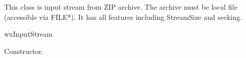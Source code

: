 %
%


\section{}\label{wxzipinputstream}

This class is input stream from ZIP archive. The archive
must be local file (accessible via FILE*).
It has all features including StreamSize and seeking.


wxInputStream




\label{wxzipinputstreamwxzipinputstream}


Constructor.





